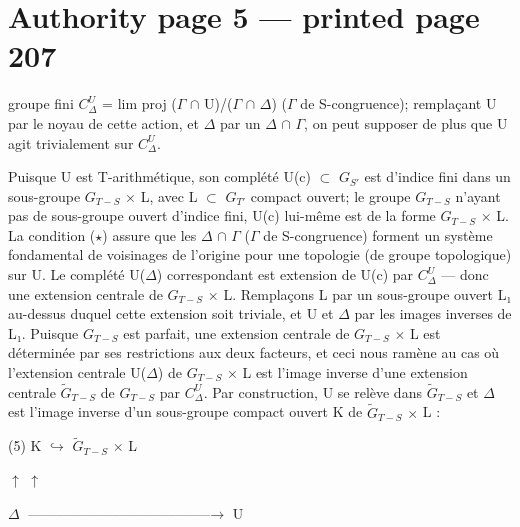 \documentclass[10pt,a4paper]{article}
\begin{document}
\section*{Authority page 5 --- printed page 207}
\noindent groupe fini \ensuremath{C^U_Δ} = lim proj (\ensuremath{Γ} \ensuremath{∩} U)/(\ensuremath{Γ} \ensuremath{∩} \ensuremath{Δ}) (\ensuremath{Γ} de S-congruence); remplaçant U par le noyau de cette action, et \ensuremath{Δ} par un \ensuremath{Δ} \ensuremath{∩} \ensuremath{Γ}, on peut supposer de plus que U agit trivialement sur \ensuremath{C^U_Δ}.\par
\smallskip
\noindent Puisque U est T-arithmétique, son complété U(c) \ensuremath{⊂} \ensuremath{G_{S′}} est d'indice fini dans un sous-groupe \ensuremath{G_{T−S}} \ensuremath{×} L, avec L \ensuremath{⊂} \ensuremath{G_{T′}} compact ouvert; le groupe \ensuremath{G_{T−S}} n'ayant pas de sous-groupe ouvert d'indice fini, U(c) lui-même est de la forme \ensuremath{G_{T−S}} \ensuremath{×} L. La condition (\ensuremath{\star}) assure que les \ensuremath{Δ} \ensuremath{∩} \ensuremath{Γ} (\ensuremath{Γ} de S-congruence) forment un système fondamental de voisinages de l'origine pour une topologie (de groupe topologique) sur U. Le complété U(\ensuremath{Δ}) correspondant est extension de U(c) par \ensuremath{C^U_Δ} — donc une extension centrale de \ensuremath{G_{T−S}} \ensuremath{×} L. Remplaçons L par un sous-groupe ouvert L\ensuremath{₁} au-dessus duquel cette extension soit triviale, et U et \ensuremath{Δ} par les images inverses de L\ensuremath{₁}. Puisque \ensuremath{G_{T−S}} est parfait, une extension centrale de \ensuremath{G_{T−S}} \ensuremath{×} L est déterminée par ses restrictions aux deux facteurs, et ceci nous ramène au cas où l'extension centrale U(\ensuremath{Δ}) de \ensuremath{G_{T−S}} \ensuremath{×} L est l'image inverse d'une extension centrale \ensuremath{\widetilde{G}_{T−S}} de \ensuremath{G_{T−S}} par \ensuremath{C^U_Δ}. Par construction, U se relève dans \ensuremath{\widetilde{G}_{T−S}} et \ensuremath{Δ} est l'image inverse d'un sous-groupe compact ouvert K de \ensuremath{\widetilde{G}_{T−S}} \ensuremath{×} L :\par
\smallskip
\noindent (5)              K \ensuremath{↪} \ensuremath{\widetilde{G}_{T−S}} \ensuremath{×} L\par
\noindent                  \ensuremath{↑}                 \ensuremath{↑}\par
\noindent                  \ensuremath{Δ} \ensuremath{\text{---}\text{---}\text{---}\text{---}\text{---}\text{---}\text{---}\text{---}\text{---}\text{---}\text{---}\text{---}\text{---}→} U\par
\end{document}
